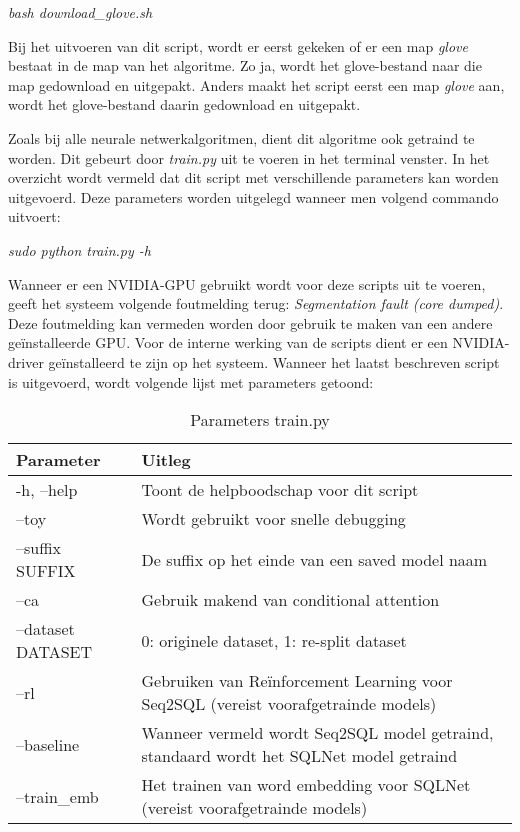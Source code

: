 \begin{center}
	\textit{bash download\_glove.sh}
\end{center}

Bij het uitvoeren van dit script, wordt er eerst gekeken of er een map \textit{glove} bestaat in de map van het algoritme. Zo ja, wordt het glove-bestand naar die map gedownload en uitgepakt. Anders maakt het script eerst een map \textit{glove} aan, wordt het glove-bestand daarin gedownload en uitgepakt. 

Zoals bij alle neurale netwerkalgoritmen, dient dit algoritme ook getraind te worden. Dit gebeurt door \textit{train.py} uit te voeren in het terminal venster. In het overzicht wordt vermeld dat dit script met verschillende parameters kan worden uitgevoerd. Deze parameters worden uitgelegd wanneer men volgend commando uitvoert:

\begin{center}
	\textit{sudo python train.py -h}
\end{center}

Wanneer er een NVIDIA-GPU gebruikt wordt voor deze scripts uit te voeren, geeft het systeem volgende foutmelding terug: \textit{Segmentation fault (core dumped)}. Deze foutmelding kan vermeden worden door gebruik te maken van een andere geïnstalleerde GPU. Voor de interne werking van de scripts dient er een NVIDIA-driver geïnstalleerd te zijn op het systeem. Wanneer het laatst beschreven script is uitgevoerd, wordt volgende lijst met parameters getoond:

\begin{table}[htb]
	\centering
	\begin{tabular}{ | l | p{5cm} |}
		\hline
		Parameter 			& Uitleg \\ \hline
		-h, --help 			& Toont de helpboodschap voor dit script \\ \hline
		--toy 				& Wordt gebruikt voor snelle debugging \\ \hline
		--suffix SUFFIX		& De suffix op het einde van een saved model naam \\ \hline
		--ca				& Gebruik makend van conditional attention \\ \hline
		--dataset DATASET 	& 0: originele dataset, 1: re-split dataset \\ \hline
		--rl				& Gebruiken van Reïnforcement Learning voor Seq2SQL (vereist voorafgetrainde models) \\ \hline
		--baseline			& Wanneer vermeld wordt Seq2SQL model getraind, standaard wordt het SQLNet model getraind \\ \hline
		--train\_emb		& Het trainen van word embedding voor SQLNet (vereist voorafgetrainde models) \\ \hline	 
	\end{tabular}
	\caption{Parameters train.py}
\end{table}

